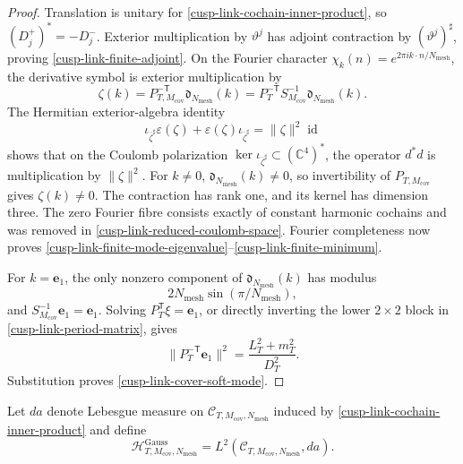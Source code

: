 \begin{proof}
Translation is unitary for \eqref{cusp-link-cochain-inner-product}, so
\((D_j^+)^*=-D_j^-\).  Exterior multiplication by \(\vartheta^j\) has
adjoint contraction by \((\vartheta^j)^\sharp\), proving
\eqref{cusp-link-finite-adjoint}.  On the Fourier character
\(\chi_k(n)=e^{2\pi i k\cdot n/N_{\mathrm{mesh}}}\), the derivative symbol
is exterior multiplication by
\[
 \zeta(k)=P_{T,M_{\mathrm{cov}}}^{-\mathsf T}
           \mathfrak d_{N_{\mathrm{mesh}}}(k)
 =P_T^{-\mathsf T}S_{M_{\mathrm{cov}}}^{-1}
           \mathfrak d_{N_{\mathrm{mesh}}}(k).
\]
The Hermitian exterior-algebra identity
\[
 \iota_{\overline\zeta^\sharp}\varepsilon(\zeta)
 +\varepsilon(\zeta)\iota_{\overline\zeta^\sharp}
 =\lVert\zeta\rVert^2\operatorname{id}
\]
shows that on the Coulomb polarization
\(\ker\iota_{\overline\zeta^\sharp}\subset(\mathbb C^4)^*\), the operator
\(d^*d\) is multiplication by \(\lVert\zeta\rVert^2\).  For \(k\neq0\),
\(\mathfrak d_{N_{\mathrm{mesh}}}(k)\neq0\), so invertibility of
\(P_{T,M_{\mathrm{cov}}}\) gives
\(\zeta(k)\neq0\).  The contraction has rank one, and its kernel has
dimension three.  The zero Fourier fibre consists exactly of constant
harmonic cochains and was removed in
\eqref{cusp-link-reduced-coulomb-space}.  Fourier completeness now proves
\eqref{cusp-link-finite-mode-eigenvalue}--\eqref{cusp-link-finite-minimum}.

For \(k=\mathbf e_1\), the only nonzero component of
\(\mathfrak d_{N_{\mathrm{mesh}}}(k)\) has modulus
\[
 2N_{\mathrm{mesh}}\sin(\pi/N_{\mathrm{mesh}}),
\]
and
\(S_{M_{\mathrm{cov}}}^{-1}\mathbf e_1=\mathbf e_1\).  Solving
\(P_T^{\mathsf T}\xi=\mathbf e_1\), or directly inverting the lower
\(2\times2\) block in \eqref{cusp-link-period-matrix}, gives
\[
 \lVert P_T^{-\mathsf T}\mathbf e_1\rVert^2
 =\frac{L_T^2+m_T^2}{D_T^2}.
\]
Substitution proves \eqref{cusp-link-cover-soft-mode}.
\end{proof}

Let \(da\) denote Lebesgue measure on
\(\mathscr C_{T,M_{\mathrm{cov}},N_{\mathrm{mesh}}}\) induced by
\eqref{cusp-link-cochain-inner-product} and define
\begin{equation}
 \mathcal H^{\mathrm{Gauss}}_{T,M_{\mathrm{cov}},N_{\mathrm{mesh}}}
 =L^2(\mathscr C_{T,M_{\mathrm{cov}},N_{\mathrm{mesh}}},da).
 \label{cusp-link-gaussian-hilbert-space}
\end{equation}


